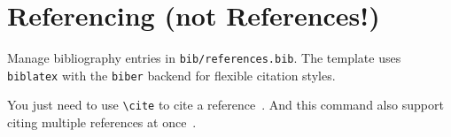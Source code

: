 \section{Referencing (not References!)}

Manage bibliography entries in \texttt{bib/references.bib}. The template uses \texttt{biblatex} with the \texttt{biber} backend for flexible citation styles.

You just need to use \texttt{\textbackslash cite} to cite a reference~\cite{knuth1990}. And this command also support citing multiple references at once~\cite{knuth1990,dummy-inbook,dummy-article}.
